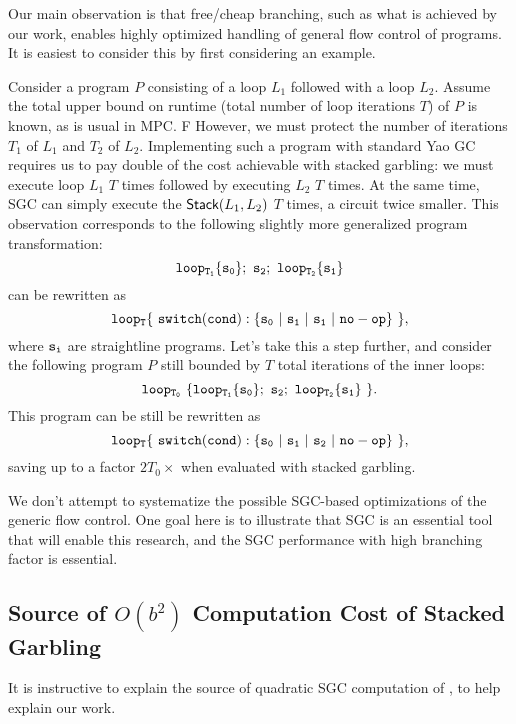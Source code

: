 Our main observation is that free/cheap branching, such as what is achieved by our work, enables highly optimized handling of general flow control of programs. It is easiest to consider this by first considering an example.

Consider a program $P$ consisting of a loop $L_1$ followed with a loop $L_2$.  Assume the total upper bound on runtime (total number of loop iterations $T$) of $P$ is known, as is usual in MPC. F However, we must protect the number of iterations $T_1$ of $L_1$ and $T_2$ of $L_2$. Implementing such a program with standard Yao GC requires us to pay double of the cost achievable with stacked garbling: we must execute loop $L_1$ $T$ times followed by executing $L_2$ $T$ times.  At the same time, SGC can simply execute the $\textsf{Stack}(L_1, L_2)$ $T$ times, a circuit twice smaller.  This observation corresponds to the following slightly more generalized program transformation:
\[{\tt loop_{T_1} \{ s_0 \} ; \ s_2;\ loop_{T_2} \{ s_1 \}} \]
can be rewritten as 
\[ {\tt loop_T \{\ switch  (cond):\{ s_0\ |\ s_1\ |\ s_1\ |\ \mathtt{no-op}\}\ \}}, \]
where ${\tt s_i}$ are straightline programs.
Let's take this a step further, and consider the following program $P$ still bounded by $T$ total iterations of the inner loops:
\[{\tt loop_{T_0}\ \{ loop_{T_1} \{ s_0 \};\ s_2;\  loop_{T_2} \{ s_1 \}\ \} }.\] 
This program can be still be rewritten as  
\[{\tt loop_{T} \{\ switch  (cond):\{ s_0\ |\ s_1\ |\ s_2\ |\ \mathtt{no-op}\}\ \}},\] 
saving up to a factor $2T_0\times$ when evaluated with stacked garbling. 

We don't attempt to systematize the possible SGC-based optimizations of the generic flow control. One goal here is to illustrate that SGC is an essential tool that will enable this research, and the SGC performance with high branching factor is essential.


 




\subsection{Source of $O(b^2)$ Computation Cost of \HK Stacked Garbling }
\label{sec:bsquaredcost}

It is instructive to explain the source of quadratic SGC computation of \HK, to help explain our work.

